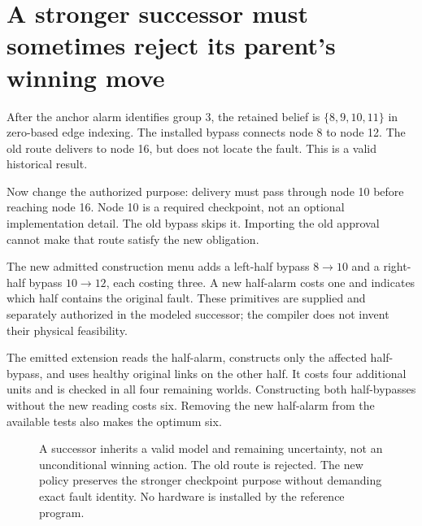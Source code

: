 \documentclass[11pt,letterpaper]{article}
\theoremstyle{remark}\newtheorem{remark}{Remark}[section]
\begin{document}
\section{A stronger successor must sometimes reject its parent's winning move}
\label{sec:successor}
After the anchor alarm identifies group 3, the retained belief is $\{8,9,10,11\}$ in zero-based edge indexing. The installed bypass connects node 8 to node 12. The old route delivers to node 16, but does not locate the fault. This is a valid historical result.

Now change the authorized purpose: delivery must pass through node 10 before reaching node 16. Node 10 is a required checkpoint, not an optional implementation detail. The old bypass skips it. Importing the old approval cannot make that route satisfy the new obligation.

The new admitted construction menu adds a left-half bypass $8\to10$ and a right-half bypass $10\to12$, each costing three. A new half-alarm costs one and indicates which half contains the original fault. These primitives are supplied and separately authorized in the modeled successor; the compiler does not invent their physical feasibility.

The emitted extension reads the half-alarm, constructs only the affected half-bypass, and uses healthy original links on the other half. It costs four additional units and is checked in all four remaining worlds. Constructing both half-bypasses without the new reading costs six. Removing the new half-alarm from the available tests also makes the optimum six.

\begin{figure}[htbp]\centering
{}
\caption{A successor inherits a valid model and remaining uncertainty, not an unconditional winning action. The old route is rejected. The new policy preserves the stronger checkpoint purpose without demanding exact fault identity. No hardware is installed by the reference program.}\label{fig:successor}
\end{figure}
\end{document}
